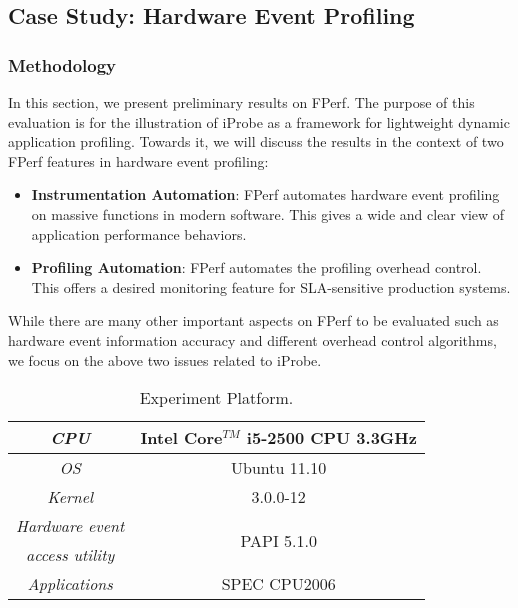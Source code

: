 \subsection{Case Study: Hardware Event Profiling}
\label{sec:eva}

\subsubsection{Methodology}

In this section, we present preliminary results on FPerf.
The purpose of this evaluation is for the illustration of iProbe
as a framework for lightweight dynamic application profiling. 
Towards it, we will discuss the results in the context of two FPerf features in hardware event profiling: 
\begin{itemize}
\item \textbf{Instrumentation Automation}: \quad FPerf automates hardware event profiling on massive functions in modern software. This gives a wide and clear view of application performance behaviors.
\item \textbf{Profiling Automation}: \quad FPerf automates the profiling overhead control. This offers a desired monitoring feature for SLA-sensitive production systems. %
\end{itemize}
While there are many other important aspects on FPerf to be evaluated such as hardware event information accuracy and different overhead control algorithms, we focus on the above two issues related to iProbe. 

\begin{table}[h!]
\caption{Experiment Platform.}
\label{tab:serverparameter}
\centering
\begin{tabular}{|c|c|}
\hline
\emph{CPU} & Intel Core$^{TM}$ i5-2500 CPU 3.3GHz\\\hline
\emph{OS} & Ubuntu 11.10 \\ \hline
\emph{Kernel} & 3.0.0-12 \\ \hline
\emph{Hardware event} &  \multirow{2}{*}{PAPI 5.1.0} \\ 
\emph{access utility} &  \\ \hline
\emph{Applications} & SPEC CPU2006 \\ \hline
\end{tabular}
\end{table}

